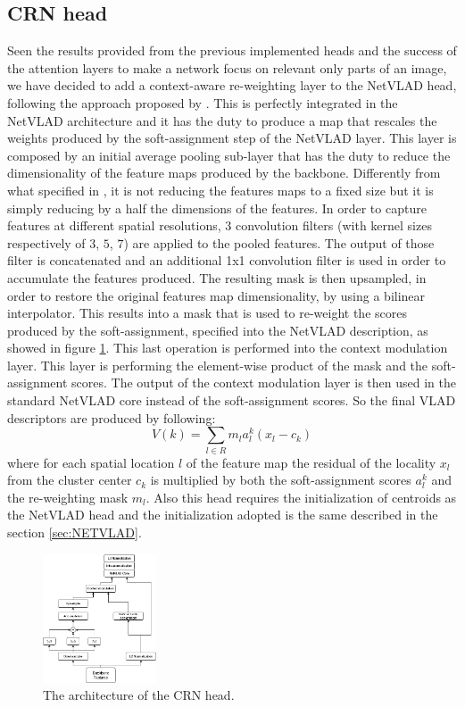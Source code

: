 \documentclass[10pt,twocolumn,letterpaper]{article}
\begin{document}
\subsection{CRN head}
Seen the results provided from the previous implemented heads and the success of the attention layers to make 
a network focus on relevant only parts of an image, we have decided to add a context-aware re-weighting layer to the NetVLAD
head, following the approach proposed by \cite{CRN}. This is perfectly integrated in the NetVLAD architecture and
it has the duty to produce a map that rescales the weights produced by the soft-assignment step of the NetVLAD layer.
This layer is composed by an initial average pooling sub-layer
that has the duty to reduce the dimensionality of the feature maps produced by the backbone. 
Differently from what specified in \cite{CRN}, it is not reducing the features maps to a fixed 
size but it is simply reducing by a half the dimensions of the features. In order to capture features at different
spatial resolutions, $3$ convolution filters (with kernel sizes respectively of $3$, $5$, $7$) are applied to the pooled features.
The  output of those filter is concatenated and an additional 1x1 convolution filter is used in order to accumulate the 
features produced. The resulting mask is then upsampled, in order to restore the original features map dimensionality,
by using a bilinear interpolator. This results into a mask that is used to re-weight the scores produced by the soft-assignment, specified
into the NetVLAD description, as showed in figure \ref{fig:CRN:ark}. This last operation is performed into the context modulation layer. This layer is 
performing the element-wise product of the mask and the soft-assignment scores. The output of the context modulation layer is then used 
in the standard NetVLAD core instead of the soft-assignment scores. So the final VLAD descriptors are produced by following:
\begin{equation}
	V(k) = \sum_{l \in R} m_l a_l^k (x_l - c_k)
\end{equation}
where for each spatial location $l$ of the feature map the residual of the locality $x_l$ from the cluster center $c_k$ 
is multiplied by both the soft-assignment scores $a_l^k$ and the re-weighting mask $m_l$. 
Also this head requires the initialization of centroids as the 
NetVLAD head and the initialization adopted is the same described in the section \ref{sec:NETVLAD}.

\begin{figure}
	\centering
	\includegraphics[width=0.3\textwidth]{img/CRN.png}
	\caption{The architecture of the CRN head.}
	\label{fig:CRN:ark}
\end{figure}
\end{document}
